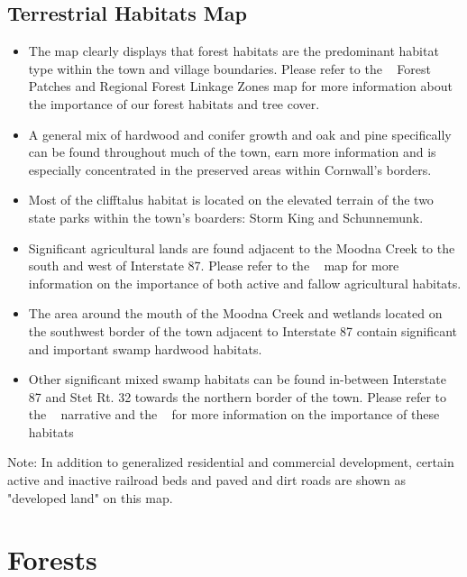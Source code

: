 \label{map:terrestrialhabitats}
\subsection*{Terrestrial Habitats Map}\label{subsec:terrestrialhabitatsmap}
\begin{itemize}
    \item The map clearly displays that forest habitats are the predominant
    habitat type within the town and village boundaries. Please refer to the
~ Forest Patches and Regional Forest Linkage Zones map for more information about
the importance of our forest habitats and tree cover.
    \item A general mix of hardwood and conifer growth and oak and pine specifically can be found
        throughout much of the town, earn more information and is especially
        concentrated in the preserved areas within Cornwall’s borders.
    \item Most of the cliff\/talus habitat is located on the elevated terrain of 
         the two state parks within the town’s boarders: Storm King and Schunnemunk.
    \item Significant agricultural lands are found adjacent to the Moodna Creek to 
        the south and west of Interstate 87. Please refer to the ~ map for more information on the importance
        of both active and fallow agricultural habitats.
    \item The area around the mouth of the Moodna Creek and wetlands located on
        the southwest border of the town adjacent to Interstate 87 contain
        significant and important swamp hardwood habitats.  
    \item Other significant
       mixed swamp habitats can be found in-between Interstate 87 and Stet Rt. 32
        towards the northern border of the town. Please refer to the ~
        narrative and the ~ for more
        information on the importance of these habitats
\end{itemize}
Note: In addition to generalized residential and commercial development, 
certain active and inactive railroad beds and paved and dirt roads are shown
as "developed land" on this map.

\section{Forests}\label{subsec:forests}
